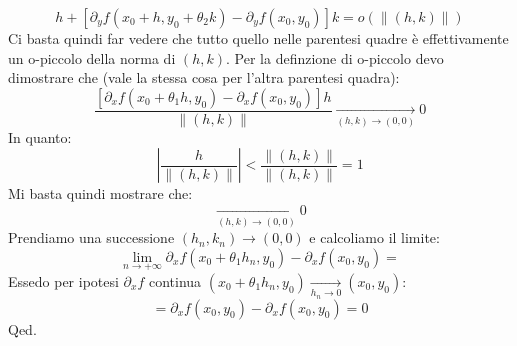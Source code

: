 {	\begin{equation*}
		[\partial_x f(x_0 + \theta_1 h, y_0) - \partial_x f(x_0, y_0) ]h + [\partial_y f(x_0 + h, y_0 + \theta_2 k) - \partial_y f(x_0, y_0)]k = o(\lVert (h, k) \rVert)
	\end{equation*}
	Ci basta quindi far vedere che tutto quello nelle parentesi quadre è effettivamente un o-piccolo della norma di $(h, k)$. Per la definzione di o-piccolo devo dimostrare che (vale la stessa cosa per l'altra parentesi quadra):
	\begin{equation*}
		\dfrac{[\partial_x f(x_0 + \theta_1 h, y_0) - \partial_x f(x_0, y_0) ]h}{\lVert (h, k) \rVert} \xrightarrow[(h, k) \to (0, 0)] {} 0
	\end{equation*}
	In quanto:
	\begin{equation*}
		\left | \dfrac{h}{\lVert (h, k) \rVert} \right | < \dfrac{\lVert (h, k) \rVert}{\lVert (h, k) \rVert} = 1
	\end{equation*}
	Mi basta quindi mostrare che:
	\begin{equation*}
		[\partial_x f(x_0 + \theta_1 h, y_0) - \partial_x f(x_0, y_0) ] \xrightarrow[(h, k) \to (0, 0)]{} 0
	\end{equation*}
	Prendiamo una successione $(h_n, k_n) \to (0, 0)$ e calcoliamo il limite:
	\begin{equation*}
		\lim_{n \to +\infty} \partial_x f(x_0 + \theta_1 h_n, y_0) - \partial_x f(x_0, y_0) =
	\end{equation*}
	Essedo per ipotesi $\partial_x f$ continua $(x_0 + \theta_1 h_n, y_0) \xrightarrow[h_n \to 0]{} (x_0, y_0)$:
	\begin{equation*}
		= \partial_x f(x_0, y_0) - \partial_x f(x_0, y_0) = 0
	\end{equation*}
	\hfill Qed.
}
